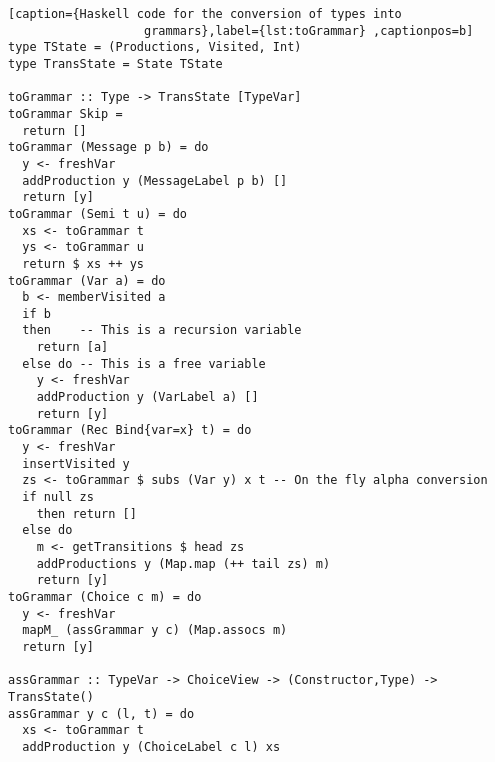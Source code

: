 \begin{lstlisting}[caption={Haskell code for the conversion of types into
                   grammars},label={lst:toGrammar} ,captionpos=b]
type TState = (Productions, Visited, Int)
type TransState = State TState

toGrammar :: Type -> TransState [TypeVar]
toGrammar Skip =
  return []
toGrammar (Message p b) = do
  y <- freshVar
  addProduction y (MessageLabel p b) []
  return [y]
toGrammar (Semi t u) = do
  xs <- toGrammar t
  ys <- toGrammar u
  return $ xs ++ ys
toGrammar (Var a) = do
  b <- memberVisited a
  if b
  then    -- This is a recursion variable
    return [a]
  else do -- This is a free variable
    y <- freshVar
    addProduction y (VarLabel a) []
    return [y]
toGrammar (Rec Bind{var=x} t) = do
  y <- freshVar
  insertVisited y
  zs <- toGrammar $ subs (Var y) x t -- On the fly alpha conversion
  if null zs
    then return []
  else do
    m <- getTransitions $ head zs
    addProductions y (Map.map (++ tail zs) m)
    return [y]
toGrammar (Choice c m) = do
  y <- freshVar
  mapM_ (assGrammar y c) (Map.assocs m)
  return [y]

assGrammar :: TypeVar -> ChoiceView -> (Constructor,Type) -> TransState()
assGrammar y c (l, t) = do
  xs <- toGrammar t
  addProduction y (ChoiceLabel c l) xs
\end{lstlisting}

